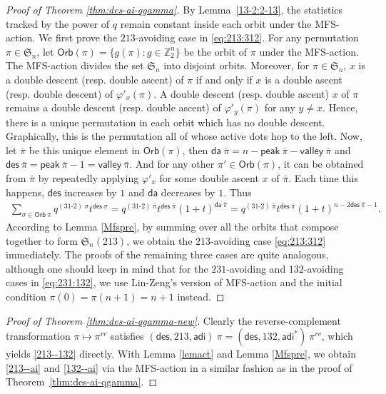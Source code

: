 \documentclass[12pt,reqno]{amsart}
\numberwithin{equation}{section}
\theoremstyle{plain}
\theoremstyle{definition}
\def\Z{\mathbb{Z}}
\def\S{\mathfrak{S}}
\def\ai{\mathsf{adi}}
\def\da{\mathsf{da}}
\def\des{\mathsf{des}}
\def\valley{\mathsf{valley}}
\def\peak{\mathsf{peak}}
\def\Orb{\mathsf{Orb}}
\def\cab{31\text{-}2}
\begin{document}
\begin{proof}[Proof of Theorem \ref{thm:des-ai-qgamma}]
By Lemma~\ref{13-2:2-13}, the statistics tracked by the power of $q$ remain constant inside each orbit under the MFS-action. We first prove the $213$-avoiding case in \eqref{eq:213:312}. For any  permutation $\pi\in\S_{n}$, let $\Orb(\pi)=\{g(\pi): g\in\Z_2^{n}\}$ be the orbit of $\pi$ under the MFS-action. The MFS-action divides the set $\S_{n}$ into disjoint orbits. Moreover, for $\pi\in \S_{n}$, $x$ is a double descent (resp. double ascent) of $\pi$ if and only if $x$ is a double ascent (resp. double descent) of $\varphi'_x(\pi)$. A double descent (resp. double ascent) $x$ of $\pi$ remains a double descent (resp. double ascent) of $\varphi'_y(\pi)$ for any $y\neq x$. Hence, there is a unique permutation in each orbit which has no double descent. Graphically, this is the permutation all of whose active dots hop to the left. Now, let $\bar\pi$ be this unique element in $\Orb(\pi)$, then $\da\:\bar{\pi}=n-\peak\:\bar{\pi}-\valley\:\bar{\pi}$ and $\des\:\bar{\pi}=\peak\:\bar{\pi}-1=\valley\:\bar{\pi}$. And for any other $\pi'\in\Orb(\pi)$, it can be obtained from $\bar{\pi}$ by repeatedly applying $\varphi'_x$ for some double ascent $x$ of $\bar{\pi}$. Each time this happens, $\des$ increases by $1$ and $\da$ decreases by $1$. Thus
\begin{align*}
\sum_{\sigma\in\Orb\:\pi}q^{(\cab)\:\sigma}t^{\des\:\sigma}=
q^{(\cab)\:\bar{\pi}}t^{\des\:\bar{\pi}}(1+t)^{\da\:\bar{\pi}}
=q^{(\cab)\:\bar{\pi}}t^{\des\:\bar{\pi}}(1+t)^{n-2\des\:\bar{\pi}-1}.
\end{align*}
According to Lemma \ref{Mfspre}, by summing over all the orbits that compose together to form $\S_n(213)$, we obtain the $213$-avoiding case \eqref{eq:213:312} immediately. The proofs of the remaining three cases are quite analogous, although one should keep in mind that for the $231$-avoiding and $132$-avoiding cases in \eqref{eq:231:132}, we use Lin-Zeng's version of MFS-action and the initial condition $\pi(0)=\pi(n+1)=n+1$ instead.
\end{proof}
\begin{proof}
[Proof of Theorem \ref{thm:des-ai-qgamma-new}] Clearly the reverse-complement transformation $\pi\mapsto \pi^{rc}$ satisfies $(\des, 213, \ai)\:\pi=(\des, 132, \ai^*)\:\pi^{rc}$, which yields \eqref{213--132} directly. With Lemma \ref{lemact} and Lemma \ref{Mfspre}, we obtain \eqref{213--ai} and \eqref{132--ai} via the MFS-action in a similar fashion as in the proof of Theorem~\ref{thm:des-ai-qgamma}.
\end{proof}
\end{document}
